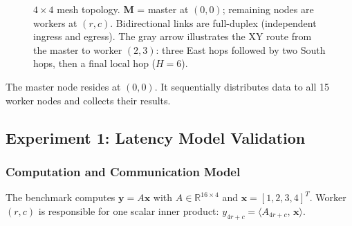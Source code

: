 \begin{figure}[t]
  \centering
  \caption{$4\times4$ mesh topology. \textbf{M} = master at $(0,0)$; remaining
           nodes are workers at $(r,c)$.  Bidirectional links are full-duplex
           (independent ingress and egress).  The gray arrow illustrates the XY
           route from the master to worker $(2,3)$: three East hops followed by two
           South hops, then a final local hop ($H=6$).}
  \label{fig:mesh4x4}
\end{figure}

The master node resides at $(0,0)$.  It sequentially distributes data to all 15
worker nodes and collects their results.

\subsection{Experiment 1: Latency Model Validation}

\subsubsection{Computation and Communication Model}

The benchmark computes $\mathbf{y} = A\mathbf{x}$ with $A\in\mathbb{R}^{16\times4}$
and $\mathbf{x}=[1,2,3,4]^T$.  Worker $(r,c)$ is responsible for one scalar inner
product: $y_{4r+c} = \langle A_{4r+c},\, \mathbf{x} \rangle$.


